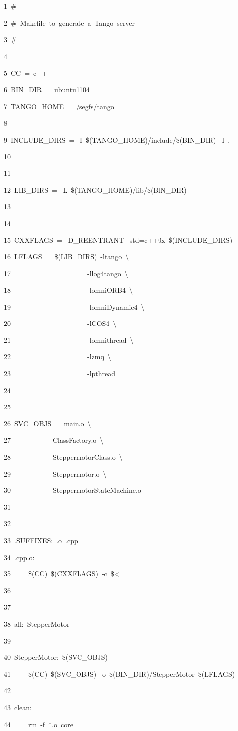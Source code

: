 
\begin{lyxcode}
1~\#

2~\#~Makefile~to~generate~a~Tango~server

3~\#

4~

5~CC~=~c++

6~BIN\_DIR~=~ubuntu1104

7~TANGO\_HOME~=~/segfs/tango

8~

9~INCLUDE\_DIRS~=~-I~\$(TANGO\_HOME)/include/\$(BIN\_DIR)~-I~.

10

11~

12~LIB\_DIRS~=~-L~\$(TANGO\_HOME)/lib/\$(BIN\_DIR)

13~

14~

15~CXXFLAGS~=~-D\_REENTRANT~-std=c++0x~\$(INCLUDE\_DIRS)

16~LFLAGS~=~\$(LIB\_DIRS)~-ltango~\textbackslash{}

17~~~~~~~~~~~~~~~~~~~~~~-llog4tango~\textbackslash{}

18~~~~~~~~~~~~~~~~~~~~~~-lomniORB4~\textbackslash{}

19~~~~~~~~~~~~~~~~~~~~~~-lomniDynamic4~\textbackslash{}

20~~~~~~~~~~~~~~~~~~~~~~-lCOS4~\textbackslash{}

21~~~~~~~~~~~~~~~~~~~~~~-lomnithread~\textbackslash{}

22~~~~~~~~~~~~~~~~~~~~~~-lzmq~\textbackslash{}

23~~~~~~~~~~~~~~~~~~~~~~-lpthread

24~

25~

26~SVC\_OBJS~=~main.o~\textbackslash{}

27~~~~~~~~~~~~ClassFactory.o~\textbackslash{}

28~~~~~~~~~~~~SteppermotorClass.o~\textbackslash{}

29~~~~~~~~~~~~Steppermotor.o~\textbackslash{}

30~~~~~~~~~~~~SteppermotorStateMachine.o

31~

32~

33~.SUFFIXES:~.o~.cpp

34~.cpp.o:

35~~~~~\$(CC)~\$(CXXFLAGS)~-c~\$<

36~

37~

38~all:~StepperMotor

39~

40~StepperMotor:~\$(SVC\_OBJS)

41~~~~~\$(CC)~\$(SVC\_OBJS)~-o~\$(BIN\_DIR)/StepperMotor~\$(LFLAGS)

42~

43~clean:

44~~~~~rm~-f~{*}.o~core
\end{lyxcode}


